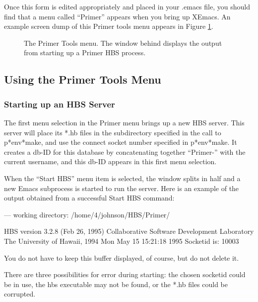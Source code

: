 Once this form is edited appropriately and placed in your .emacs file, 
you should find that a menu called ``Primer'' appears when you bring up 
XEmacs.   An example screen dump of this Primer tools menu appears in 
Figure \ref{fig:primer-tools}.

\begin{figure}[htbp]
\centerline{}
\caption{The Primer Tools menu.  The window behind displays the output
from starting up a Primer HBS process.}  
\label{fig:primer-tools}
\end{figure}

\subsection{Using the Primer Tools Menu}

\subsubsection{Starting up an HBS Server}


The first menu selection in the Primer menu brings up a new HBS server.
This server will place its *.hb files in the subdirectory specified in the
call to p*env*make, and use the connect socket number specified in
p*env*make.  It creates a db-ID for this database by concatenating together
``Primer-'' with the current username, and this db-ID appears in this 
first menu selection. 

When the ``Start HBS''  menu item is selected, the window splits in half
and a new Emacs subprocess is started to run the server.  Here is an
example of the output obtained from a successful Start HBS command:

\begin{code}
--- working directory: /home/4/johnson/HBS/Primer/

HBS version 3.2.8 (Feb 26, 1995)
Collaborative Software Development Laboratory 
The University of Hawaii, 1994
Mon May 15 15:21:18 1995
Socketid is: 10003
\end{code}

You do not have to keep this buffer displayed, of course, but do not delete
it. 

There are three possibilities for error during starting: the chosen
socketid could be in use, the hbs executable may not be found, or 
the *.hb files could be corrupted. 

